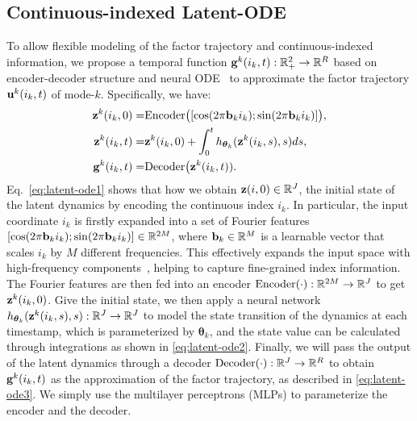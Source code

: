 \subsection{Continuous-indexed Latent-ODE}\label{sec:Latent-ODE-Flow}
To allow flexible modeling of the factor trajectory and continuous-indexed information, 
 we propose a temporal function $\mathbf{g}^k(i_k,t):\mathbb{R}^{2}_{+}\to \mathbb{R}^{R}$ based on encoder-decoder structure and neural ODE~\citep{chen2018neural} to approximate the factor trajectory $\mathbf{u}^k(i_k,t)$ of mode-$k$.  Specifically, we have:
 \vspace{-2mm}
\begin{align}
        \mathbf{z}^{k}(i_k,0) = & \text{Encoder}\big([\cos(2\pi\mathbf{b}_ki_k); \sin(2\pi\mathbf{b}_ki_k)]\big), \label{eq:latent-ode1}\\
        \mathbf{z}^{k}(i_k,t) = & \mathbf{z}^{k}(i_k,0) + \int_0^{t} h_{\boldsymbol{\theta}_k}(\mathbf{z}^{k}(i_k,s), s)ds,\label{eq:latent-ode2}\\
        \mathbf{g}^k(i_k,t) = & \text{Decoder}\big(\mathbf{z}^{k}(i_k,t)).\label{eq:latent-ode3}
\end{align}
 Eq.~\eqref{eq:latent-ode1} shows that how we obtain $\mathbf{z}(i,0) \in \mathbb{R}^{J}$, the initial state of the latent dynamics by encoding the continuous index $i_k$. In particular, the input coordinate $i_k$ is firstly expanded into a set of Fourier features $[\cos(2\pi\mathbf{b}_ki_k); \sin(2\pi\mathbf{b}_ki_k)] \in \mathbb{R}^{2M}$, where $\mathbf{b}_k\in \mathbb{R}^{M}$ is a learnable vector that scales  $i_k$  by $M$ different frequencies. This effectively expands the input space with high-frequency components~\citep{tancik2020fourier}, helping to capture fine-grained index information. The Fourier features are then fed into an encoder
$\text{Encoder}(\cdot):\mathbb{R}^{2M}\to \mathbb{R}^{J}$ to get $\mathbf{z}^{k}(i_k,0)$. Give the initial state, we then apply a neural network $ h_{\boldsymbol{\theta}_k}(\mathbf{z}^{k}(i_k,s), s):\mathbb{R}^{J}\to \mathbb{R}^{J}$ to model the state transition of the dynamics at each timestamp, which is parameterized by $\boldsymbol{\theta}_k$, and the state value can be calculated through integrations as shown in \eqref{eq:latent-ode2}. Finally, we will pass the output of the latent dynamics through a decoder $\text{Decoder}(\cdot):\mathbb{R}^{J}\to \mathbb{R}^{R}$ to obtain $\mathbf{g}^k(i_k,t)$ as the approximation  of the factor trajectory, as described in \eqref{eq:latent-ode3}. We  simply use the multilayer perceptrons (MLPs) to parameterize the encoder and the decoder.

